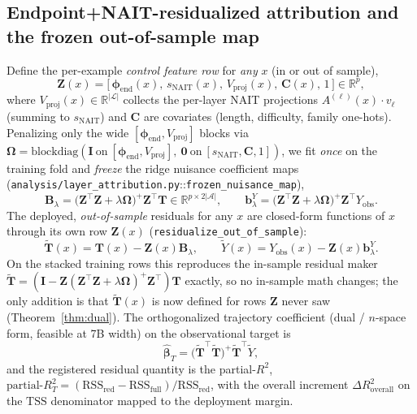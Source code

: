 \documentclass[11pt]{article}
\theoremstyle{definition}
\newcommand{\phend}{\bm{\phi}_{\mathrm{end}}}
\newcommand{\Tmat}{\mathbf{T}}
\newcommand{\Ttil}{\widetilde{\mathbf{T}}}
\newcommand{\Zmat}{\mathbf{Z}}
\newcommand{\Blam}{\mathbf{B}_{\lambda}}
\newcommand{\R}{\mathbb{R}}
\newcommand{\Aset}{\mathcal{A}}
\newcommand{\Lset}{\mathcal{L}}
\begin{document}
\subsection{Endpoint+NAIT-residualized attribution and the frozen out-of-sample map}
\label{sec:residual}
Define the per-example \emph{control feature row} for \emph{any} $x$ (in or out of
sample),
\begin{equation}
\Zmat(x)=\big[\,\phend(x),\,s_{\mathrm{NAIT}}(x),\,V_{\mathrm{proj}}(x),\,\mathbf C(x),\,1\,\big]\in\R^{p},
\label{eq:Z}
\end{equation}
where $V_{\mathrm{proj}}(x)\in\R^{|\Lset|}$ collects the per-layer NAIT projections
$A^{(\ell)}(x)\cdot v_\ell$ (summing to $s_{\mathrm{NAIT}}$) and $\mathbf C$ are
covariates (length, difficulty, family one-hots). Penalizing only the wide
$[\phend,V_{\mathrm{proj}}]$ blocks via $\bm\Omega=\mathrm{blockdiag}(\mathbf I\ \text{on}\
[\phend,V_{\mathrm{proj}}],\ \mathbf0\ \text{on}\ [s_{\mathrm{NAIT}},\mathbf C,1])$, we fit
\emph{once} on the training fold and \emph{freeze} the ridge nuisance coefficient maps
(\texttt{analysis/layer\_attribution.py}::\texttt{frozen\_nuisance\_map}),
\begin{equation}
\Blam=\big(\Zmat^\top\Zmat+\lambda\bm\Omega\big)^{+}\Zmat^\top\Tmat\in\R^{p\times2|\Aset|},
\qquad
\mathbf b_\lambda^{Y}=\big(\Zmat^\top\Zmat+\lambda\bm\Omega\big)^{+}\Zmat^\top Y_{\mathrm{obs}}.
\label{eq:Blam}
\end{equation}
The deployed, \emph{out-of-sample} residuals for any $x$ are closed-form functions of $x$
through its own row $\Zmat(x)$ (\texttt{residualize\_out\_of\_sample}):
\begin{equation}
\Ttil(x)=\Tmat(x)-\Zmat(x)\Blam,\qquad \widetilde Y(x)=Y_{\mathrm{obs}}(x)-\Zmat(x)\mathbf b_\lambda^{Y}.
\label{eq:resid}
\end{equation}
On the stacked training rows this reproduces the in-sample residual maker
$\Ttil=(\mathbf I-\Zmat(\Zmat^\top\Zmat+\lambda\bm\Omega)^{+}\Zmat^\top)\Tmat$ exactly, so
no in-sample math changes; the only addition is that $\Ttil(x)$ is now defined for rows
$\Zmat$ never saw (Theorem~\ref{thm:dual}). The orthogonalized trajectory coefficient
(dual / $n$-space form, feasible at 7B width) on the observational target is
\begin{equation}
\hat{\bm\beta}_T=\big(\Ttil^\top\Ttil\big)^{+}\Ttil^\top\widetilde Y,
\label{eq:beta}
\end{equation}
and the registered residual quantity is the partial-$R^2$,
$\mathrm{partial\text{-}}R^2_T=(\mathrm{RSS}_{\mathrm{red}}-\mathrm{RSS}_{\mathrm{full}})/
\mathrm{RSS}_{\mathrm{red}}$, with the overall increment $\Delta R^2_{\mathrm{overall}}$
on the $\mathrm{TSS}$ denominator mapped to the deployment margin.
\end{document}
